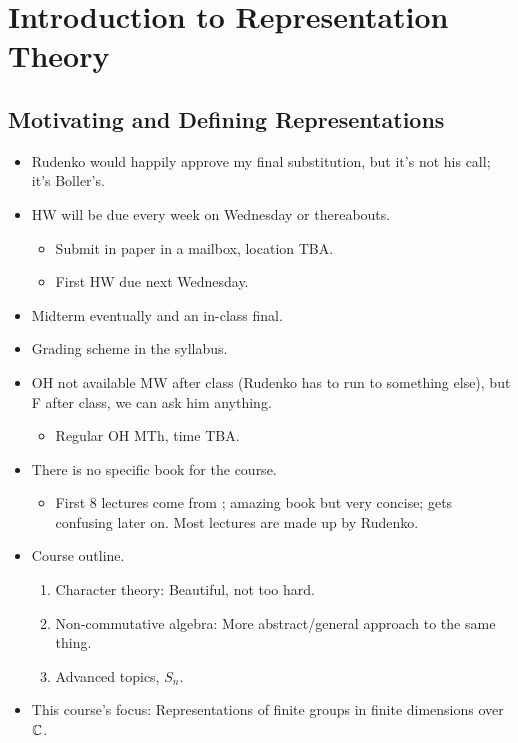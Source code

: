 \documentclass[../notes.tex]{subfiles}
\begin{document}
\chapter{Introduction to Representation Theory}
\section{Motivating and Defining Representations}
\begin{itemize}
    \item {}Rudenko would happily approve my final substitution, but it's not his call; it's Boller's.
    \item HW will be due every week on Wednesday or thereabouts.
    \begin{itemize}
        \item Submit in paper in a mailbox, location TBA.
        \item First HW due next Wednesday.
    \end{itemize}
    \item Midterm eventually and an in-class final.
    \item Grading scheme in the syllabus.
    \item OH not available MW after class (Rudenko has to run to something else), but F after class, we can ask him anything.
    \begin{itemize}
        \item Regular OH MTh, time TBA.
    \end{itemize}
    \item There is no specific book for the course.
    \begin{itemize}
        \item First 8 lectures come from \textcite{bib:Serre}; amazing book but very concise; gets confusing later on. Most lectures are made up by Rudenko.
    \end{itemize}
    \item Course outline.
    \begin{enumerate}
        \item Character theory: Beautiful, not too hard.
        \item Non-commutative algebra: More abstract/general approach to the same thing.
        \item Advanced topics, $S_n$.
    \end{enumerate}
    \item This course's focus: Representations of finite groups in finite dimensions over $\mathbb{C}$.

\end{itemize}
\end{document}
